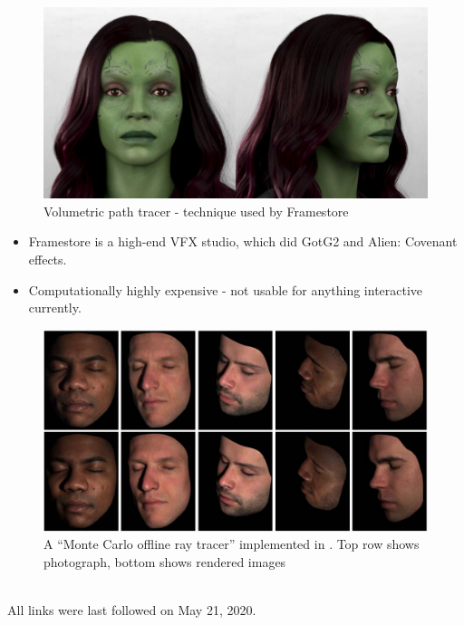 \documentclass[ngerman,runningheads,a4paper]{llncs}[2018/03/10]
\begin{document}
\begin{figure}
\includegraphics[scale=0.275,keepaspectratio]{./images/framestore-digital-gamora.jpg}
\caption{Volumetric path tracer - technique used by Framestore \protect\footnotemark}
\end{figure}

\begin{itemize}
  \item Framestore is a high-end VFX studio, which did GotG2 and Alien: Covenant effects.
  \item Computationally highly expensive - not usable for anything interactive currently.
\end{itemize}

\begin{figure}
\includegraphics[scale=0.275,keepaspectratio]{./images/monte-carlo-ray-tracer.jpg}
\caption{A \enquote{Monte Carlo offline ray tracer} implemented in \citet{weyrich2006analysis}. Top row shows photograph, bottom shows rendered images}
\end{figure}

\renewcommand{\bibsection}{\section{Referenzen}} %

\begingroup
  \ifluatex
  \else
  \fi
  \small %
  
\endgroup

\ \\
%
All links were last followed on May 21, 2020.
\end{document}
